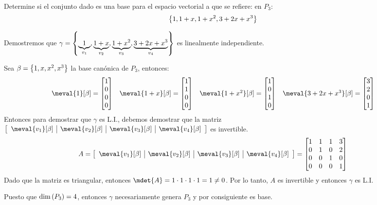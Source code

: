 \begin{exercise}
	Determine si el conjunto dado es una base para el espacio vectorial a que se refiere: en $P_{3}$: \[ \left\{ 1, 1 + x, 1 + x^{2}, 3 + 2x + x^{3} \right\} \]
\end{exercise}
\begin{solution}
	Demostremos que $\gamma =\left\{ \underbrace{1}_{v_{1}}, \underbrace{1 + x}_{v_{2}}, \underbrace{1 + x^{2}}_{v_{3}}, \underbrace{3 + 2x + x^{3}}_{v_{4}} \right\}$ es linealmente independiente. \par 
	Sea $\beta =\left\{ 1, x, x^{2}, x^{3} \right\}$ la base canónica de $P_{3}$, entonces:
	\[ 
		\begin{array}{cccc}
			\meval{1}[\beta] =
			\begin{bmatrix}
				1\\
				0\\
				0\\
				0
			\end{bmatrix}
			&
			\meval{1 + x}[\beta] =
			\begin{bmatrix}
				1\\
				1\\
				0\\
				0
			\end{bmatrix}
			&
			\meval{1 + x^{2}}[\beta] =
			\begin{bmatrix}
				1\\
				0\\
				1\\
				0
			\end{bmatrix}
			&
			\meval{3 + 2x + x^{3}}[\beta] =
			\begin{bmatrix}
				3\\
				2\\
				0\\
				1
			\end{bmatrix}
		\end{array}
	\]
	Entonces para demostrar que $\gamma$ es L.I., debemos demostrar que la matriz $\bracket{\begin{array}{c|c|c|c}
		\meval{v_{1}}[\beta] & \meval{v_{2}}[\beta] & \meval{v_{3}}[\beta] & \meval{v_{4}}[\beta]
	\end{array}}$ es invertible.
	\[  
		A = \bracket{\begin{array}{c|c|c|c}
				\meval{v_{1}}[\beta] & \meval{v_{2}}[\beta] & \meval{v_{3}}[\beta] & \meval{v_{4}}[\beta]
		\end{array}}
		=
		\begin{bmatrix}
			1 & 1 & 1 & 3\\
			0 & 1 & 0 & 2\\
			0 & 0 & 1 & 0\\
			0 & 0 & 0 & 1
		\end{bmatrix}
	\]
	Dado que la matriz es triangular, entonces $\mdet{A} = 1\cdot 1\cdot 1\cdot 1 = 1\neq 0$. Por lo tanto, $A$ es invertible y entonces $\gamma$ es L.I.\par 
	Puesto que $\mdim{P_{3}} = 4$, entonces $\gamma$ necesariamente genera $P_{3}$ y por consiguiente es base.
\end{solution}
